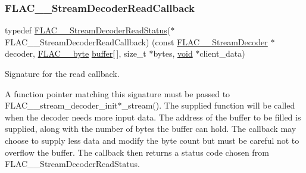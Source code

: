 \subsubsection{\texorpdfstring{FLAC\_\_StreamDecoderReadCallback}{FLAC\_\_StreamDecoderReadCallback}}
{\footnotesize\ttfamily typedef \mbox{\hyperlink{group__flac__stream__decoder_gad793ead451206c64a91dc0b851027b93}{F\+L\+A\+C\+\_\+\+\_\+\+Stream\+Decoder\+Read\+Status}}($\ast$ F\+L\+A\+C\+\_\+\+\_\+\+Stream\+Decoder\+Read\+Callback) (const \mbox{\hyperlink{struct_f_l_a_c_____stream_decoder}{F\+L\+A\+C\+\_\+\+\_\+\+Stream\+Decoder}} $\ast$decoder, \mbox{\hyperlink{ordinals_8h_a5eb569b12d5b047cdacada4d57924ee3}{F\+L\+A\+C\+\_\+\+\_\+byte}} \mbox{\hyperlink{_s_d_l__opengl__glext_8h_a76461e97a098d2c9ae20ac193d3825ae}{buffer}}\mbox{[}$\,$\mbox{]}, size\+\_\+t $\ast$bytes, \mbox{\hyperlink{_s_d_l__opengles2__gl2ext_8h_ae5d8fa23ad07c48bb609509eae494c95}{void}} $\ast$client\+\_\+data)}

Signature for the read callback.

A function pointer matching this signature must be passed to F\+L\+A\+C\+\_\+\+\_\+stream\+\_\+decoder\+\_\+init$\ast$\+\_\+stream(). The supplied function will be called when the decoder needs more input data. The address of the buffer to be filled is supplied, along with the number of bytes the buffer can hold. The callback may choose to supply less data and modify the byte count but must be careful not to overflow the buffer. The callback then returns a status code chosen from F\+L\+A\+C\+\_\+\+\_\+\+Stream\+Decoder\+Read\+Status.

